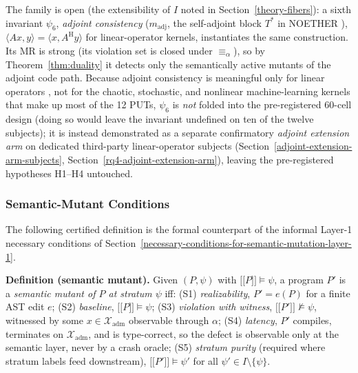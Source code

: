 \documentclass[manuscript,screen,review]{acmart}
\begin{document}
The family is open (the extensibility of $I$ noted in Section~\ref{theory-fibers}): a sixth
invariant $\psi_6$, \emph{adjoint consistency} ($m_{\mathrm{adj}}$, the
self-adjoint block $T^{*}$ in NOETHER \citep{noether2026}),
$\langle A x, y\rangle = \langle x, A^{\mathrm{H}} y\rangle$ for
linear-operator kernels, instantiates the same construction. Its MR is
strong (its violation set is closed under $\equiv_\alpha$), so by
Theorem~\ref{thm:duality} it detects only the semantically active mutants of the adjoint code
path. Because adjoint consistency is meaningful only for linear operators
, not for the chaotic, stochastic, and nonlinear machine-learning
kernels that make up most of the 12 PUTs, $\psi_6$ is \emph{not} folded
into the pre-registered 60-cell design (doing so would leave the invariant
undefined on ten of the twelve subjects); it is instead demonstrated as a
separate confirmatory \emph{adjoint extension arm} on dedicated
third-party linear-operator subjects (Section~\ref{adjoint-extension-arm-subjects}, Section~\ref{rq4-adjoint-extension-arm}), leaving the
pre-registered hypotheses H1--H4 untouched.

\subsubsection{Semantic-Mutant Conditions}\label{theory-s1s5}

The following certified definition is the formal counterpart of the
informal Layer-1 necessary conditions of Section~\ref{necessary-conditions-for-semantic-mutation-layer-1}.

\textbf{Definition (semantic mutant).} Given $(P, \psi)$ with
$\mathopen{\lbrack\!\lbrack} P \mathclose{\rbrack\!\rbrack} \models \psi$, a program $P'$ is a
\emph{semantic mutant of $P$ at stratum $\psi$} iff: (S1)
\emph{realizability}, $P' = e(P)$ for a finite AST edit $e$; (S2)
\emph{baseline}, $\mathopen{\lbrack\!\lbrack} P \mathclose{\rbrack\!\rbrack} \models \psi$; (S3)
\emph{violation with witness},
$\mathopen{\lbrack\!\lbrack} P' \mathclose{\rbrack\!\rbrack} \not\models \psi$, witnessed by some
$x \in \mathcal{X}_{\mathrm{adm}}$ observable through $\alpha$; (S4)
\emph{latency}, $P'$ compiles, terminates on $\mathcal{X}_{\mathrm{adm}}$,
and is type-correct, so the defect is observable only at the semantic
layer, never by a crash oracle; (S5) \emph{stratum purity} (required
where stratum labels feed downstream),
$\mathopen{\lbrack\!\lbrack} P' \mathclose{\rbrack\!\rbrack} \models \psi'$ for all
$\psi' \in I \setminus \{\psi\}$.
\end{document}

